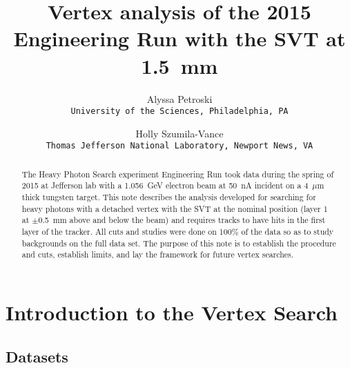 \documentclass[twoside]{article}
\title{\vspace{-15mm}\fontsize{20pt}{10pt}\selectfont\textbf{Vertex analysis of the 2015 Engineering Run with the SVT at 1.5~mm}} %
\author{
  Alyssa Petroski\\
  \texttt{University of the Sciences, Philadelphia, PA}
  \and
 Holly  Szumila-Vance\\
  \texttt{Thomas Jefferson National Laboratory, Newport News, VA}
}
\date{}
\begin{document}
\maketitle %

\thispagestyle{fancy} %


\begin{abstract}

The Heavy Photon Search experiment Engineering Run took data during the spring of 2015 at Jefferson lab with a 1.056~GeV electron beam at 50~nA incident on a 4~$\mu$m thick tungsten target. This note describes the analysis developed for searching for heavy photons with a detached vertex with the SVT at the nominal position (layer 1 at $\pm$0.5~mm above and below the beam) and requires tracks to have hits in the first layer of the tracker. All cuts and studies were done on 100$\%$ of the data so as to study backgrounds on the full data set. The purpose of this note is to establish the procedure and cuts, establish limits, and lay the framework for future vertex searches.  

\end{abstract}
\newpage
\tableofcontents
\newpage
 \listoffigures
 \newpage
\listoftables
\newpage

\section{Introduction to the Vertex Search}

\subsection{Datasets}
\end{document}

